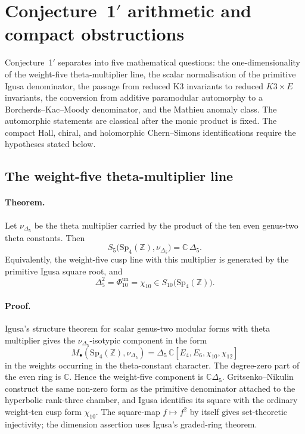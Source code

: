 
\providecommand{\kBKM}{\kappa_{\mathrm{BKM}}}
\providecommand{\kch}{\kappa_{\mathrm{ch}}}
\providecommand{\kcat}{\kappa_{\mathrm{cat}}}
\providecommand{\kfib}{\kappa_{\mathrm{fiber}}}
\providecommand{\Sp}{\mathrm{Sp}}
\providecommand{\ZZ}{\mathbb{Z}}
\providecommand{\CC}{\mathbb{C}}
\providecommand{\Mtf}{M_{24}}

\section{Conjecture~1$'$ arithmetic and compact obstructions}
\label{sec:conj1-prime-arithmetic}

Conjecture~1$'$ separates into five mathematical questions: the
one-dimensionality of the weight-five theta-multiplier line, the scalar
normalisation of the primitive Igusa denominator, the passage from reduced
K3 invariants to reduced \(K3\times E\) invariants, the conversion from
additive paramodular automorphy to a Borcherds--Kac--Moody denominator, and
the Mathieu anomaly class.  The automorphic statements are classical after
the monic product is fixed.  The compact Hall, chiral, and holomorphic
Chern--Simons identifications require the hypotheses stated below.

\subsection*{The weight-five theta-multiplier line}
\label{subsec:conj1-weight-five-line}

\paragraph{Theorem.}
Let \(\nu_{\Delta_5}\) be the theta multiplier carried by the product of
the ten even genus-two theta constants.  Then
\[
        S_5\bigl(\Sp_4(\ZZ),\nu_{\Delta_5}\bigr)=\CC\,\Delta_5 .
\]
Equivalently, the weight-five cusp line with this multiplier is generated
by the primitive Igusa square root, and
\[
        \Delta_5^2=\Phi_{10}^{\mathrm{un}}=\chi_{10}
        \in S_{10}\bigl(\Sp_4(\ZZ)\bigr).
\]

\paragraph{Proof.}
Igusa's structure theorem for scalar genus-two modular forms with theta
multiplier gives the \(\nu_{\Delta_5}\)-isotypic component in the form
\[
        M_\bullet(\Sp_4(\ZZ),\nu_{\Delta_5})
        =
        \Delta_5\,
        \CC[E_4,E_6,\chi_{10},\chi_{12}]
\]
in the weights occurring in the theta-constant character.  The degree-zero
part of the even ring is \(\CC\).  Hence the weight-five component is
\(\CC\Delta_5\).  Gritsenko--Nikulin construct the same non-zero form as
the primitive denominator attached to the hyperbolic rank-three chamber,
and Igusa identifies its square with the ordinary weight-ten cusp form
\(\chi_{10}\).  The square-map \(f\mapsto f^2\) by itself gives
set-theoretic injectivity; the dimension assertion uses Igusa's graded-ring
theorem.

